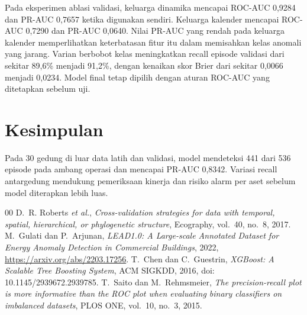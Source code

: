 \documentclass[conference]{IEEEtran}
\begin{document}
Pada eksperimen ablasi validasi, keluarga dinamika mencapai ROC-AUC 0,9284 dan PR-AUC 0,7657 ketika digunakan sendiri. Keluarga kalender mencapai ROC-AUC 0,7290 dan PR-AUC 0,0640. Nilai PR-AUC yang rendah pada keluarga kalender memperlihatkan keterbatasan fitur itu dalam memisahkan kelas anomali yang jarang. Varian berbobot kelas meningkatkan recall episode validasi dari sekitar 89,6\% menjadi 91,2\%, dengan kenaikan skor Brier dari sekitar 0,0066 menjadi 0,0234. Model final tetap dipilih dengan aturan ROC-AUC yang ditetapkan sebelum uji.


\section{Kesimpulan}
Pada 30 gedung di luar data latih dan validasi, model mendeteksi 441 dari 536 episode pada ambang operasi dan mencapai PR-AUC 0,8342. Variasi recall antargedung mendukung pemeriksaan kinerja dan risiko alarm per aset sebelum model diterapkan lebih luas.

\begin{thebibliography}{00}
 D.~R. Roberts \emph{et al.}, \emph{Cross-validation strategies for data with temporal, spatial, hierarchical, or phylogenetic structure}, Ecography, vol.~40, no.~8, 2017.
 M.~Gulati dan P.~Arjunan, \emph{LEAD1.0: A Large-scale Annotated Dataset for Energy Anomaly Detection in Commercial Buildings}, 2022, \url{https://arxiv.org/abs/2203.17256}.
 T.~Chen dan C.~Guestrin, \emph{XGBoost: A Scalable Tree Boosting System}, ACM SIGKDD, 2016, doi: 10.1145/2939672.2939785.
 T.~Saito dan M.~Rehmsmeier, \emph{The precision-recall plot is more informative than the ROC plot when evaluating binary classifiers on imbalanced datasets}, PLOS ONE, vol.~10, no.~3, 2015.
\end{thebibliography}
\end{document}
